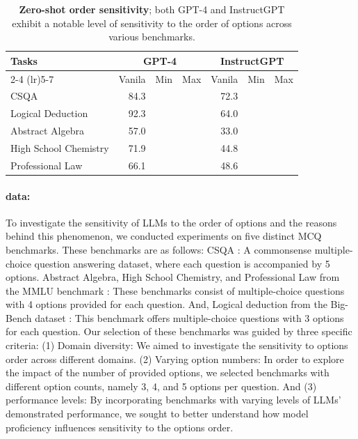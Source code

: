 \documentclass[11pt]{article}
\begin{document}
\begin{table}
\small
\centering
\begin{tabular}{lrrrrrr}
\toprule 
\multirow{2}{*}{\bf Tasks} & \multicolumn{3}{c}{\bf GPT-4}&  \multicolumn{3}{c}{\bf InstructGPT}\\
\cmidrule(lr){2-4}
\cmidrule(lr){5-7}
&Vanila&Min&Max&Vanila&Min&Max\\
\midrule
CSQA &84.3&\color{cadmiumred}{-12.6}&\color{cadmiumgreen}{+10.3}&72.3&\color{cadmiumred}{-24.0}&\color{cadmiumgreen}{+19.1}\\
Logical Deduction&92.3&\color{cadmiumred}{-8.1}&\color{cadmiumgreen}{+5.0}&64.0&\color{cadmiumred}{-39.4}&\color{cadmiumgreen}{+34.7}\\
Abstract Algebra &57.0&\color{cadmiumred}{-30.0}&\color{cadmiumgreen}{+23.0}&33.0&\color{cadmiumred}{-31.0}&\color{cadmiumgreen}{+39.0}\\
High School Chemistry &71.9&\color{cadmiumred}{-23.6}&\color{cadmiumgreen}{+18.2}&44.8&\color{cadmiumred}{-28.5}&\color{cadmiumgreen}{+38.0}\\
Professional Law &66.1&\color{cadmiumred}{-12.7}&\color{cadmiumgreen}{+12.1}&48.6&\color{cadmiumred}{-24.9}&\color{cadmiumgreen}{+25.7}\\
\bottomrule
\end{tabular}
\caption{\textbf{Zero-shot order sensitivity}; both GPT-4 and InstructGPT exhibit a notable level of sensitivity to the order of options across various benchmarks.}
\label{tab:attack-zero}
\end{table}

\paragraph{data:} 
To investigate the sensitivity of LLMs to the order of options and the reasons behind this phenomenon, we conducted experiments on five distinct MCQ benchmarks. These benchmarks are as follows:
CSQA \citep{talmor2018commonsenseqa}: A commonsense multiple-choice question answering dataset, where each question is accompanied by 5 options. 
Abstract Algebra, High School Chemistry, and Professional Law from the MMLU benchmark \citep{hendrycks2020measuring}: These benchmarks consist of multiple-choice questions with 4 options provided for each question. 
And, Logical deduction from the Big-Bench dataset \citep{srivastava2022beyond}: This benchmark offers multiple-choice questions with 3 options for each question.
Our selection of these benchmarks was guided by three specific criteria:
(1) Domain diversity: We aimed to investigate the sensitivity to options order across different domains. 
(2) Varying option numbers: In order to explore the impact of the number of provided options, we selected benchmarks with different option counts, namely 3, 4, and 5 options per question. 
And (3) performance levels: By incorporating benchmarks with varying levels of LLMs' demonstrated performance, we sought to better understand how model proficiency influences sensitivity to the options order. 
\end{document}
